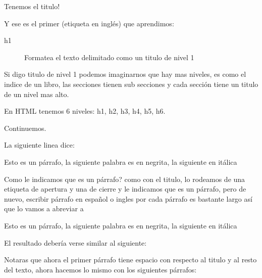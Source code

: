 \documentclass[letterpaper,10pt,spanish]{sphinxmanual}
\begin{document}
Tenemos el titulo!

Y ese es el primer  (etiqueta en inglés) que aprendimos:
\begin{description}
\item[{h1}] \leavevmode
Formatea el texto delimitado como un titulo de nivel 1

\end{description}

Si digo titulo de nivel 1 podemos imaginarnos que hay mas niveles, es como
el indice de un libro, las secciones tienen sub secciones y cada sección tiene
un titulo de un nivel mas alto.

En HTML tenemos 6 niveles: h1, h2, h3, h4, h5, h6.

Continuemos.

La siguiente linea dice:

%
\begin{sphinxVerbatim}[commandchars=\\\{\}]
Esto es un párrafo, la siguiente palabra es en negrita, la siguiente en itálica
\end{sphinxVerbatim}

Como le indicamos que es un párrafo? como con el titulo, lo rodeamos de una etiqueta de apertura y una de cierre y le indicamos que es un párrafo, pero de nuevo, escribir párrafo en español o ingles por cada párrafo es bastante largo así que lo vamos a abreviar a 

%
\begin{sphinxVerbatim}[commandchars=\\\{\}]
Esto es un párrafo, la siguiente palabra es en negrita, la siguiente en itálica
\end{sphinxVerbatim}

El resultado debería verse similar al siguiente:

\begin{figure}[htbp]
\centering

\noindent{}
\end{figure}

Notaras que ahora el primer párrafo tiene espacio con respecto al titulo y al
resto del texto, ahora hacemos lo mismo con los siguientes párrafos:
\end{document}
